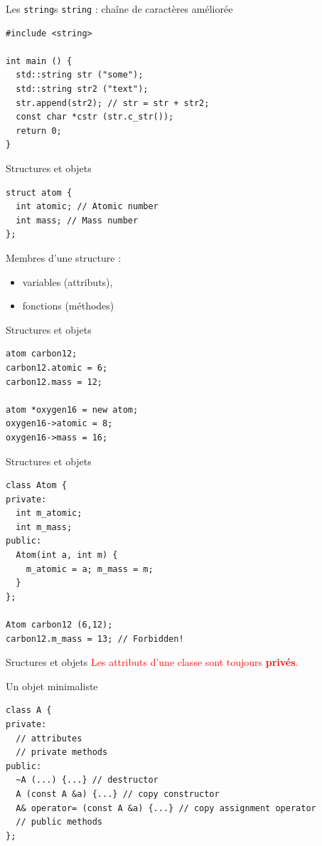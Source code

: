 
\begin{frame}[fragile]{Les \texttt{string}s}
  \texttt{string} : chaîne de caractères améliorée
  \begin{lstlisting}
#include <string>
    
int main () {
  std::string str ("some");
  std::string str2 ("text");
  str.append(str2); // str = str + str2;
  const char *cstr (str.c_str());
  return 0;
}
    \end{lstlisting}
\end{frame}

\begin{frame}[fragile]{Structures et objets}
  \begin{lstlisting}
struct atom {
  int atomic; // Atomic number
  int mass; // Mass number
};
  \end{lstlisting}

  Membres d'une structure :
  \begin{itemize}
  \item variables (attributs),
  \item fonctions (méthodes)
  \end{itemize}
\end{frame}

\begin{frame}[fragile]{Structures et objets}
  \begin{lstlisting}
atom carbon12;
carbon12.atomic = 6;
carbon12.mass = 12;

atom *oxygen16 = new atom;
oxygen16->atomic = 8;
oxygen16->mass = 16;
  \end{lstlisting}
\end{frame}

\begin{frame}[fragile]{Structures et objets}
  \begin{lstlisting}
class Atom {
private:
  int m_atomic;
  int m_mass;
public:
  Atom(int a, int m) {
    m_atomic = a; m_mass = m;
  }
};

Atom carbon12 (6,12);
carbon12.m_mass = 13; // Forbidden!
  \end{lstlisting}
\end{frame}

\begin{frame}{Sructures et objets}
  \textcolor{red}{Les attributs d'une classe sont toujours \textbf{privés}.}
\end{frame}

\begin{frame}[fragile]{Un objet minimaliste}
  \begin{lstlisting}
class A {
private:
  // attributes
  // private methods
public:
  ~A (...) {...} // destructor
  A (const A &a) {...} // copy constructor
  A& operator= (const A &a) {...} // copy assignment operator
  // public methods
};
  \end{lstlisting}
\end{frame}


